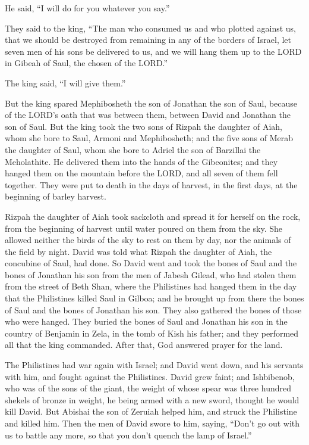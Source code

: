 He said, ``I will do for you whatever you say.''

 They said to the king, ``The man who consumed us and who
plotted against us, that we should be destroyed from remaining in any of
the borders of Israel,  let seven men of his sons be
delivered to us, and we will hang them up to the LORD in Gibeah of Saul,
the chosen of the LORD.''

The king said, ``I will give them.''

 But the king spared Mephibosheth the son of Jonathan the
son of Saul, because of the LORD's oath that was between them, between
David and Jonathan the son of Saul.  But the king took the
two sons of Rizpah the daughter of Aiah, whom she bore to Saul, Armoni
and Mephibosheth; and the five sons of Merab the daughter of Saul, whom
she bore to Adriel the son of Barzillai the Meholathite.  He
delivered them into the hands of the Gibeonites; and they hanged them on
the mountain before the LORD, and all seven of them fell together. They
were put to death in the days of harvest, in the first days, at the
beginning of barley harvest.

 Rizpah the daughter of Aiah took sackcloth and spread it
for herself on the rock, from the beginning of harvest until water
poured on them from the sky. She allowed neither the birds of the sky to
rest on them by day, nor the animals of the field by night.
 David was told what Rizpah the daughter of Aiah, the
concubine of Saul, had done.  So David went and took the
bones of Saul and the bones of Jonathan his son from the men of Jabesh
Gilead, who had stolen them from the street of Beth Shan, where the
Philistines had hanged them in the day that the Philistines killed Saul
in Gilboa;  and he brought up from there the bones of Saul
and the bones of Jonathan his son. They also gathered the bones of those
who were hanged.  They buried the bones of Saul and
Jonathan his son in the country of Benjamin in Zela, in the tomb of Kish
his father; and they performed all that the king commanded. After that,
God answered prayer for the land.

 The Philistines had war again with Israel; and David went
down, and his servants with him, and fought against the Philistines.
David grew faint;  and Ishbibenob, who was of the sons of
the giant, the weight of whose spear was three hundred shekels of bronze
in weight, he being armed with a new sword, thought he would kill David.
 But Abishai the son of Zeruiah helped him, and struck the
Philistine and killed him. Then the men of David swore to him, saying,
``Don't go out with us to battle any more, so that you don't quench the
lamp of Israel.''


